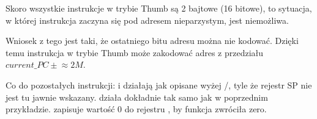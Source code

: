 Skoro wszystkie instrukcje w trybie Thumb są 2 bajtowe (16 bitowe), to sytuacja, w której instrukcja zaczyna się pod adresem nieparzystym, jest niemożliwa.

Wniosek z tego jest taki, że ostatniego bitu adresu można nie kodować.
Dzięki temu instrukcja  w trybie Thumb może zakodować adres z przedziału $current\_PC \pm{}\approx{}2M$.

Co do pozostałych instrukcji: \PUSH i \POP działają jak opisane wyżej /, tyle że rejestr \ac{SP} nie jest tu jawnie wskazany.
 działa dokładnie tak samo jak w poprzednim przykładzie.
 zapisuje wartość 0 do rejestru , by funkcja zwróciła zero.


